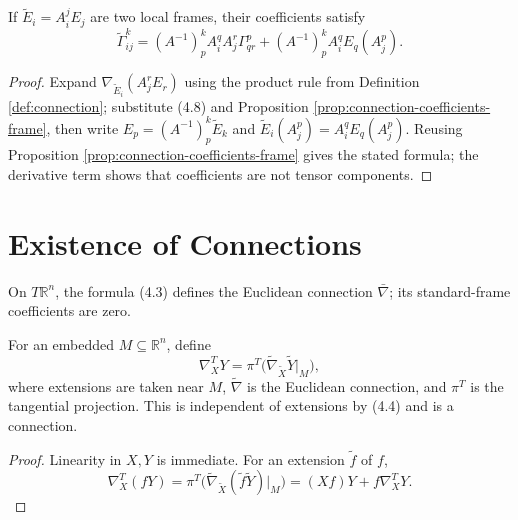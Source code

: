 \begin{proposition}
\label{prop:transformation-law-connection-coefficients}
\leanok
If $\widetilde E_i=A^j_iE_j$ are two local frames, their coefficients satisfy
\[
\widetilde\Gamma^k_{ij}=(A^{-1})^k_pA^q_iA^r_j\Gamma^p_{qr}+(A^{-1})^k_pA^q_iE_q(A^p_j).
\]
\end{proposition}
\begin{proof}
\leanok
\sketch Expand $\nabla_{\widetilde E_i}(A^r_jE_r)$ using the product rule from Definition \ref{def:connection}; substitute (4.8) and Proposition \ref{prop:connection-coefficients-frame}, then write $E_p=(A^{-1})^k_p\widetilde E_k$ and $\widetilde E_i(A^p_j)=A^q_iE_q(A^p_j)$. Reusing Proposition \ref{prop:connection-coefficients-frame} gives the stated formula; the derivative term shows that coefficients are not tensor components.
\end{proof}

\section{Existence of Connections}

\begin{example}
\label{ex:euclidean-connection}
On $T\mathbb R^n$, the formula (4.3) defines the Euclidean connection $\bar\nabla$; its standard-frame coefficients are zero.
\end{example}

\begin{example}
\label{ex:tangential-connection-submanifold}
For an embedded $M\subseteq\mathbb R^n$, define
\[
\nabla_X^TY=\pi^T\bigl(\widetilde\nabla_{\widetilde X}\widetilde Y|_M\bigr),
\]
where extensions are taken near $M$, $\widetilde\nabla$ is the Euclidean connection, and $\pi^T$ is the tangential projection. This is independent of extensions by (4.4) and is a connection.
\end{example}
\begin{proof}
\sketch Linearity in $X,Y$ is immediate. For an extension $\widetilde f$ of $f$,
\[
\nabla_X^T(fY)=\pi^T\bigl(\widetilde\nabla_{\widetilde X}(\widetilde f\widetilde Y)|_M\bigr)=(Xf)Y+f\nabla_X^TY.
\]
\end{proof}

